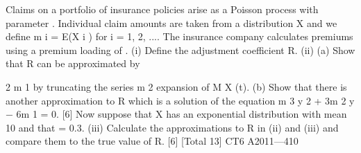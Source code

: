 Claims on a portfolio of insurance policies arise as a Poisson process with parameter
\lambda . Individual claim amounts are taken from a distribution X and we define m i = E(X i )
for i = 1, 2, .... The insurance company calculates premiums using a premium
loading of \theta .
(i) Define the adjustment coefficient R.
(ii) (a)
Show that R can be approximated by

2 \theta  m 1
by truncating the series
m 2
expansion of M X (t).
(b)
Show that there is another approximation to R which is a solution of
the equation m 3 y 2 + 3m 2 y − 6\theta m 1 = 0.
[6]
Now suppose that X has an exponential distribution with mean 10 and that \theta  = 0.3.
(iii)
Calculate the approximations to R in (ii) and (iii) and compare them to the true
value of R.
[6]
[Total 13]
CT6 A2011—410




